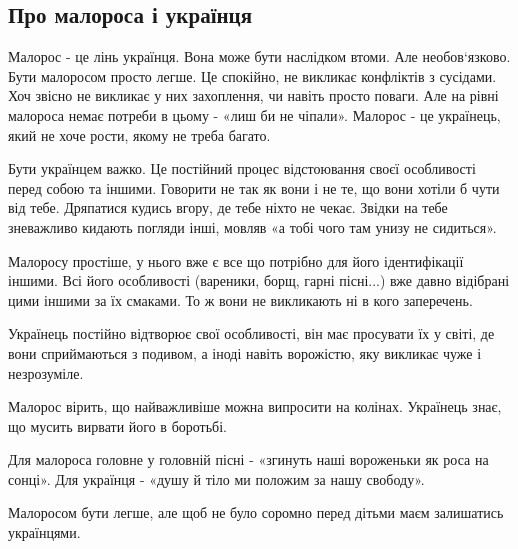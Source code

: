  
 
 
 
 

\subsection{Про малороса і українця}

Малорос - це лінь українця. Вона може бути наслідком втоми. Але необов‘язково.
Бути малоросом просто легше. Це спокійно, не викликає конфліктів  з сусідами.
Хоч звісно не викликає у них захоплення, чи навіть просто поваги. Але на рівні
малороса немає потреби в цьому - «лиш би не чіпали». Малорос - це українець,
який не хоче рости, якому не треба багато.

Бути українцем важко. Це постійний процес відстоювання своєї особливості перед
собою та іншими. Говорити не так як вони і не те, що вони хотіли б чути від
тебе. Дряпатися кудись вгору, де тебе ніхто не чекає. Звідки на тебе зневажливо
кидають погляди інші, мовляв «а тобі чого там унизу не сидиться». 

Малоросу простіше, у нього вже є все що потрібно для його ідентифікації іншими.
Всі його особливості (вареники, борщ, гарні пісні...) вже давно відібрані  цими
іншими за їх смаками. То ж вони не викликають ні в кого заперечень. 

Українець постійно відтворює свої особливості, він має  просувати їх у світі,
де вони сприймаються з подивом, а іноді навіть ворожістю, яку викликає чуже і
незрозуміле. 

Малорос вірить, що найважливіше можна випросити на колінах. Українець знає, що
мусить вирвати його в боротьбі. 

Для малороса головне у головній пісні - «згинуть наші вороженьки як роса на
сонці». Для українця - «душу й тіло ми положим за нашу свободу». 

Малоросом бути легше,  але щоб не було соромно перед дітьми маєм залишатись
українцями. 
